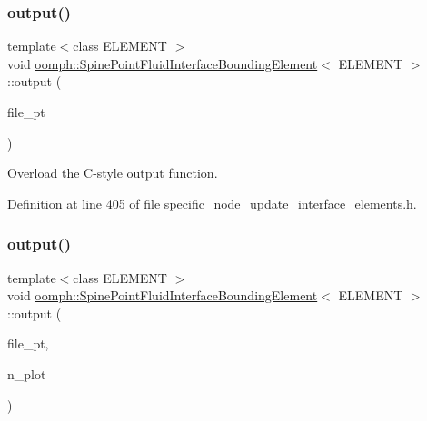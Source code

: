 \subsubsection{\texorpdfstring{output()}{output()}\hspace{0.1cm}{\footnotesize\ttfamily [3/4]}}
{\footnotesize\ttfamily template$<$class E\+L\+E\+M\+E\+NT $>$ \\
void \hyperlink{classoomph_1_1SpinePointFluidInterfaceBoundingElement}{oomph\+::\+Spine\+Point\+Fluid\+Interface\+Bounding\+Element}$<$ E\+L\+E\+M\+E\+NT $>$\+::output (\begin{DoxyParamCaption}\item[{F\+I\+LE $\ast$}]{file\+\_\+pt }\end{DoxyParamCaption})\hspace{0.3cm}{\ttfamily [inline]}}



Overload the C-\/style output function. 



Definition at line 405 of file specific\+\_\+node\+\_\+update\+\_\+interface\+\_\+elements.\+h.

\mbox{\label{classoomph_1_1SpinePointFluidInterfaceBoundingElement_a75a530620bfa2a983fec2e1c7f801db2}} 
\subsubsection{\texorpdfstring{output()}{output()}\hspace{0.1cm}{\footnotesize\ttfamily [4/4]}}
{\footnotesize\ttfamily template$<$class E\+L\+E\+M\+E\+NT $>$ \\
void \hyperlink{classoomph_1_1SpinePointFluidInterfaceBoundingElement}{oomph\+::\+Spine\+Point\+Fluid\+Interface\+Bounding\+Element}$<$ E\+L\+E\+M\+E\+NT $>$\+::output (\begin{DoxyParamCaption}\item[{F\+I\+LE $\ast$}]{file\+\_\+pt,  }\item[{const unsigned \&}]{n\+\_\+plot }\end{DoxyParamCaption})\hspace{0.3cm}{\ttfamily [inline]}}




